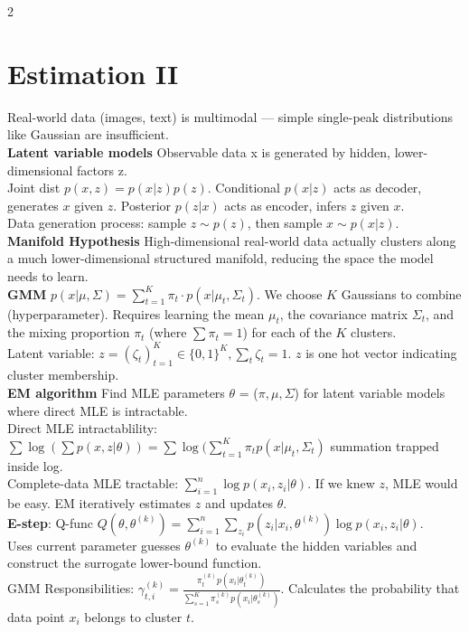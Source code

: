 \documentclass[10pt]{article}
\begin{document}
\begin{multicols*}{2}
\section*{Estimation II}
Real-world data (images, text) is multimodal — simple single-peak distributions like Gaussian are insufficient.\\
\textbf{Latent variable models} Observable data x is generated by hidden, lower-dimensional factors z.\\
Joint dist $p(x,z) = p(x|z)p(z)$. Conditional $p(x|z)$ acts as decoder, generates $x$ given $z$. Posterior $p(z|x)$ acts as encoder, infers $z$ given $x$.\\
Data generation process: sample $z \sim p(z)$, then sample $x \sim p(x|z)$.\\
\textbf{Manifold Hypothesis} High-dimensional real-world data actually clusters along a much lower-dimensional structured manifold, reducing the space the model needs to learn.\\
\textbf{GMM} $p(x|\mu,\Sigma) = \sum_{t=1}^K \pi_t \cdot p(x|\mu_t, \Sigma_t)$. We choose $K$ Gaussians to combine (hyperparameter). Requires learning the mean $\mu_t$, the covariance matrix $\Sigma_t$, and the mixing proportion $\pi_t$ (where $\sum \pi_t = 1$) for each of the $K$ clusters.\\
Latent variable: $z = (\zeta_t)_{t=1}^K \in \{0,1\}^K, \sum_t \zeta_t=1$. $z$ is one hot vector indicating cluster membership.\\
\textbf{EM algorithm} Find MLE parameters $\theta$ = ($\pi, \mu, \Sigma$) for latent variable models where direct MLE is intractable.\\
Direct MLE intractablility: $\sum \log(\sum p(x,z|\theta)) = \sum \log(\sum\limits_{t=1}^K \pi_t p(x|\mu_t, \Sigma_t)$ summation trapped inside log.\\
Complete-data MLE tractable: $\sum\limits_{i=1}^n \log p(x_i, z_i|\theta)$. If we knew $z$, MLE would be easy. EM iteratively estimates $z$ and updates $\theta$.\\
\textbf{E-step}: Q-func $Q(\theta, \theta^{(k)}) = \sum_{i=1}^n \sum_{z_i} p(z_i|x_i, \theta^{(k)}) \log p(x_i, z_i|\theta)$.\\
Uses current parameter guesses $\theta^{(k)}$ to evaluate the hidden variables and construct the surrogate lower-bound function.\\
GMM Responsibilities: $\gamma_{t,i}^{(k)} = \frac{\pi_t^{(k)} p(x_i|\theta_t^{(k)})}{\sum_{s=1}^K \pi_s^{(k)} p(x_i|\theta_s^{(k)})}$. Calculates the probability that data point $x_i$ belongs to cluster $t$.\\

\end{multicols*}
\end{document}
